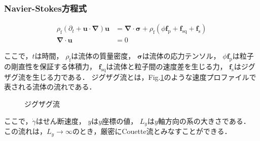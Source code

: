 \subsubsection{Navier-Stokes方程式}
    \begin{align}
        \rho_\mathrm{f} (\partial _t + \boldsymbol{u} \cdot \boldsymbol{\nabla} ) \boldsymbol{u} &= 
            \boldsymbol{\nabla} \cdot \boldsymbol{\sigma} + 
            \rho_\mathrm{f} (\phi \boldsymbol{f}_\mathrm{p} + \boldsymbol{f}_\mathrm{sq} + \boldsymbol{f}_\mathrm{s}) \\
        \boldsymbol{\nabla} \cdot \boldsymbol{u} &= 0
    \end{align}

ここで，$t$は時間，
$\rho_\mathrm{f}$は流体の質量密度，
$\boldsymbol{\sigma}$は流体の応力テンソル，
$\phi \boldsymbol{f}_\mathrm{p}$は粒子の剛直性を保証する体積力，
$\boldsymbol{f}_\mathrm{sq}$は流体と粒子間の速度差を生じる力，
$\boldsymbol{f}_\mathrm{s}$はジグザグ流を生じる力である．
ジグザグ流とは，Fig.\ref{zig_zag}のような速度プロファイルで表される流体の流れである．
    \begin{figure}[htbp]
        \label{zig_zag}
        \caption{ジグザグ流}
    \end{figure}

\noindent
ここで，$\dot{\gamma}$はせん断速度，
$y$は$y$座標の値，
$L_y$は$y$軸方向の系の大きさである．
この流れは，$L_y \rightarrow \infty$のとき，厳密にCouette流とみなすことができる．
